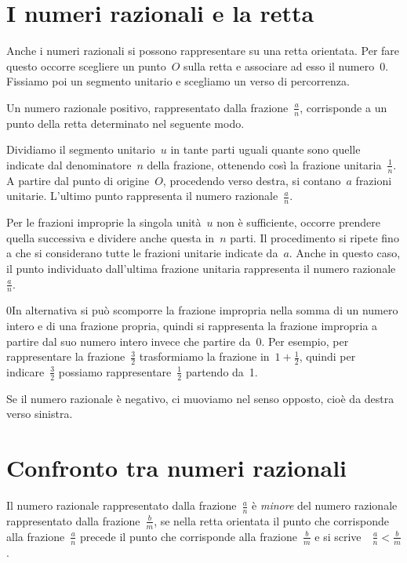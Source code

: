 \section{I numeri razionali e la retta}

Anche i numeri razionali si possono rappresentare su una retta orientata. Per fare questo occorre
scegliere un punto~$O$ sulla retta e associare ad esso il numero~0. Fissiamo poi un segmento unitario e scegliamo
un verso di percorrenza.

Un numero razionale positivo, rappresentato dalla frazione~$\frac{a}{n}$, corrisponde a un punto della retta determinato nel seguente modo.

Dividiamo il segmento unitario~$u$ in tante parti uguali
quante sono quelle indicate dal denominatore~$n$ della frazione, ottenendo così la frazione unitaria~$\frac{1}{n}$.
A partire dal punto di origine~$O$, procedendo verso destra, si contano~$a$ frazioni unitarie.
L'ultimo punto rappresenta il numero razionale~$\frac{a}{n}$.

Per le frazioni improprie la singola unità~$u$ non è sufficiente, occorre prendere quella successiva e
dividere anche questa in~$n$ parti. Il procedimento si ripete fino a che si considerano tutte
le frazioni unitarie indicate da~$a$. Anche in questo caso, il punto individuato dall'ultima frazione unitaria
rappresenta il numero razionale~$\frac{a}{n}$.

0In alternativa si può scomporre la frazione impropria
nella somma di un numero intero e di una frazione propria, quindi si rappresenta la frazione impropria
a partire dal suo numero intero invece che partire da~0.
Per esempio, per rappresentare la frazione~$\frac{3}{2}$
trasformiamo la frazione in~$1+\frac{1}{2}$, quindi per indicare~$\frac{3}{2}$ possiamo rappresentare~$\frac{1}{2}$ partendo da~1.

Se il numero razionale è negativo, ci muoviamo nel senso opposto, cioè da destra verso sinistra.

\begin{center}

\end{center}

\ovalbox{\risolvii \ref{ese:3.33}, \ref{ese:3.34}, \ref{ese:3.35}}

\section{Confronto tra numeri razionali}

Il numero razionale rappresentato dalla frazione~$\frac{a}{n}$ è \emph{minore} del numero razionale
rappresentato dalla frazione~$\frac{b}{m}$, se nella retta orientata il punto che corrisponde alla
frazione~$\frac{a}{n}$ precede il punto che corrisponde alla frazione~$\frac{b}{m}$ e si scrive\ \  $\frac{a}{n}<\frac{b}{m}$.

